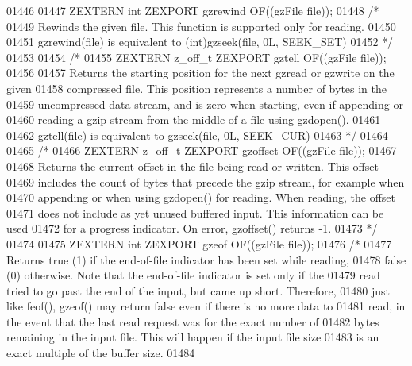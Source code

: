 \begin{DoxyCode}
01446 
01447 ZEXTERN \textcolor{keywordtype}{int} ZEXPORT    gzrewind OF((gzFile file));
01448 \textcolor{comment}{/*}
01449 \textcolor{comment}{     Rewinds the given file. This function is supported only for reading.}
01450 \textcolor{comment}{}
01451 \textcolor{comment}{     gzrewind(file) is equivalent to (int)gzseek(file, 0L, SEEK\_SET)}
01452 \textcolor{comment}{*/}
01453 
01454 \textcolor{comment}{/*}
01455 \textcolor{comment}{ZEXTERN z\_off\_t ZEXPORT    gztell OF((gzFile file));}
01456 \textcolor{comment}{}
01457 \textcolor{comment}{     Returns the starting position for the next gzread or gzwrite on the given}
01458 \textcolor{comment}{   compressed file.  This position represents a number of bytes in the}
01459 \textcolor{comment}{   uncompressed data stream, and is zero when starting, even if appending or}
01460 \textcolor{comment}{   reading a gzip stream from the middle of a file using gzdopen().}
01461 \textcolor{comment}{}
01462 \textcolor{comment}{     gztell(file) is equivalent to gzseek(file, 0L, SEEK\_CUR)}
01463 \textcolor{comment}{*/}
01464 
01465 \textcolor{comment}{/*}
01466 \textcolor{comment}{ZEXTERN z\_off\_t ZEXPORT gzoffset OF((gzFile file));}
01467 \textcolor{comment}{}
01468 \textcolor{comment}{     Returns the current offset in the file being read or written.  This offset}
01469 \textcolor{comment}{   includes the count of bytes that precede the gzip stream, for example when}
01470 \textcolor{comment}{   appending or when using gzdopen() for reading.  When reading, the offset}
01471 \textcolor{comment}{   does not include as yet unused buffered input.  This information can be used}
01472 \textcolor{comment}{   for a progress indicator.  On error, gzoffset() returns -1.}
01473 \textcolor{comment}{*/}
01474 
01475 ZEXTERN \textcolor{keywordtype}{int} ZEXPORT gzeof OF((gzFile file));
01476 \textcolor{comment}{/*}
01477 \textcolor{comment}{     Returns true (1) if the end-of-file indicator has been set while reading,}
01478 \textcolor{comment}{   false (0) otherwise.  Note that the end-of-file indicator is set only if the}
01479 \textcolor{comment}{   read tried to go past the end of the input, but came up short.  Therefore,}
01480 \textcolor{comment}{   just like feof(), gzeof() may return false even if there is no more data to}
01481 \textcolor{comment}{   read, in the event that the last read request was for the exact number of}
01482 \textcolor{comment}{   bytes remaining in the input file.  This will happen if the input file size}
01483 \textcolor{comment}{   is an exact multiple of the buffer size.}
01484 \textcolor{comment}{}

\end{DoxyCode}
